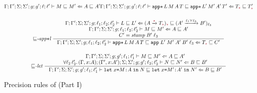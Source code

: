 \begin{figure}[tbp]
{\begin{gather*}
{      \precctx{\Gamma}{\Gamma'}{\Sigma}{\Sigma'}{g}{g'}{\ell}{\ell'}\ccprec{M}{M'}{A}{A'}}
              {\precctx{\Gamma}{\Gamma'}{\Sigma}{\Sigma'}{g}{g'}{\ell}{\ell'}\ccprec{\ccappstar{L}{M}{A}{T}}{\ccappstar{L'}{M'}{A'}{T'}}{T_{\unk}}{T'_{\unk}}}
  \\[3ex]
    {\sqsubseteq}\textit{-app${\star}$l}~
    \inference{\precctx{\Gamma}{\Gamma'}{\Sigma}{\Sigma'}{g}{\ell_1}{\ell_2}{\ell_2'}\ccprec{L}{L'}{(\Fun{A}{\unk}{T_{\unk}})_{\unk}}{(\Fun{A'}{\ell_1 \curlyvee \ell_3}{B'})_{\ell_3}} \\
                  \precctx{\Gamma}{\Gamma'}{\Sigma}{\Sigma'}{g}{\ell_1}{\ell_2}{\ell_2'}\ccprec{M}{M'}{A}{A'} \\
                  C' = \mathit{stamp}\;B'\;\ell_3}
              {\precctx{\Gamma}{\Gamma'}{\Sigma}{\Sigma'}{g}{\ell_1}{\ell_2}{\ell_2'}\ccprec{\ccappstar{L}{M}{A}{T}}{\ccapp{L'}{M'}{A'}{B'}{\ell_3}}{T_{\unk}}{C'}}
  \\[3ex]
  {\sqsubseteq}\textit{-let}~
  \inference{\precctx{\Gamma}{\Gamma'}{\Sigma}{\Sigma'}{g}{g'}{\ell_1}{\ell_1'}\ccprec{M}{M'}{A}{A'} \\
  \forall \ell_2\,\ell_2'.\, \precctx{(\Gamma,x{:}A)}{(\Gamma',x{:}A')}{\Sigma}{\Sigma'}{g}{g'}{\ell_2}{\ell_2'}\ccprec{N}{N'}{B}{B'}}
  {\precctx{\Gamma}{\Gamma'}{\Sigma}{\Sigma'}{g}{g'}{\ell_1}{\ell_1'}\ccprec{\cclet{x}{M}{A}{N}}{\cclet{x}{M'}{A'}{N'}}{B}{B'}}
  \end{gather*}}
  \caption{Precision rules of \CC (Part I)}
  \label{fig:cc-prec-1}
\end{figure}

